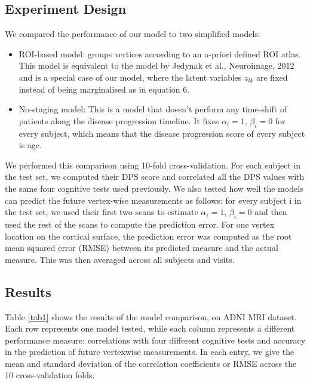 \subsection{Experiment Design}

We compared the performance of our model to two simplified models:
\begin{itemize}
 \item ROI-based model: groups vertices according to an a-priori defined ROI atlas. This model is equivalent to the model by Jedynak et al., Neuroimage, 2012 and is a special case of our model, where the latent variables $z_{lk}$ are fixed instead of being marginalised as in equation 6.
 \item No-staging model: This is a model that doesn't perform any time-shift of patients along the disease progression timeline. It fixes $\alpha_i=1$, $\beta_i=0$ for every subject, which means that the disease progression score of every subject is age.
\end{itemize}

We performed this comparison using 10-fold cross-validation. For each subject in the test set, we computed their DPS score and correlated all the DPS values with the same four cognitive tests used previously. We also tested how well the models can predict the future vertex-wise measurements as follows: for every subject i in the test set, we used their first two scans to estimate $\alpha_i=1$, $\beta_i=0$ and then used the rest of the scans to compute the prediction error. For one vertex location on the cortical surface, the prediction error was computed as the root mean squared error (RMSE) between its predicted measure and the actual measure. This was then averaged across all subjects and visits. 


\subsection{Results}

Table \ref{tab1} shows the results of the model comparison, on ADNI MRI dataset. Each row represents one model tested, while each column represents a different performance measure: correlations with four different cognitive tests and accuracy in the prediction of future vertexwise measurements. In each entry, we give the mean and standard deviation of the correlation coefficients or RMSE across the 10 cross-validation folds.  

